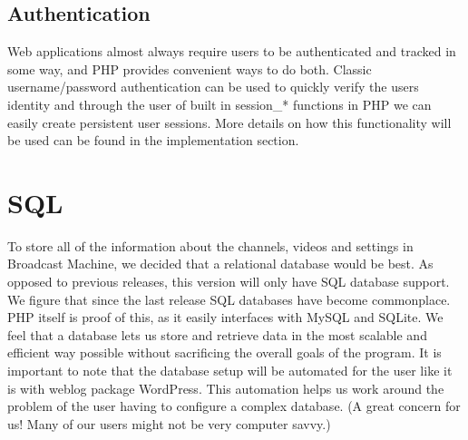 \documentclass[a4paper,12pt]{report}
\begin{document}
\subsection{Authentication}
Web applications almost always require users to be authenticated and tracked in some way, and PHP provides convenient ways to do both.
Classic username/password authentication can be used to quickly verify the users identity and through the user of built in session\_* functions in PHP we can easily create persistent user sessions.
More details on how this functionality will be used can be found in the implementation section.

\section{SQL}
To store all of the information about the channels, videos and settings in Broadcast Machine, we decided that a relational database would be best. 
As opposed to previous releases, this version will only have SQL database support.
We figure that since the last release SQL databases have become commonplace.
PHP itself is proof of this, as it easily interfaces with MySQL and SQLite.
We feel that a database lets us store and retrieve data in the most scalable and efficient way possible without sacrificing the overall goals of the program.
It is important to note that the database setup will be automated for the user like it is with weblog package WordPress.
This automation helps us work around the problem of the user having to configure a complex database. (A great concern for us! Many of our users might not be very computer savvy.)
\end{document}
